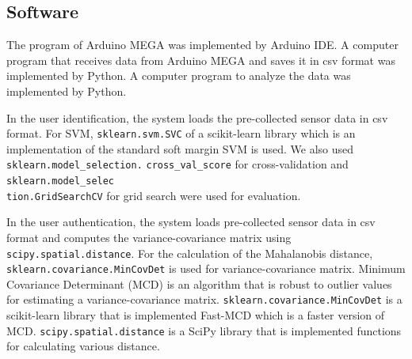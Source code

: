 \documentclass[sigchi,authordraft]{acmart}
\begin{document}
\subsection{Software}
The program of Arduino MEGA was implemented by Arduino IDE. A computer program that receives data from Arduino MEGA and saves it in csv format was implemented by Python. A computer program to analyze the data was implemented by Python.\par


In the user identification, the system loads the pre-collected sensor data in csv format. For SVM, \texttt{sklearn.svm.SVC} of a scikit-learn\cite{scikit-learn} library which is an implementation of the standard soft margin SVM is used. We also used \texttt{sklearn.model\_selection.} \texttt{cross\_val\_score} for cross-validation and \texttt{sklearn.model\_selec}\\\texttt{tion.GridSearchCV} for grid search were used for evaluation.\par


In the user authentication, the system loads pre-collected sensor data in csv format and computes the variance-covariance matrix using \texttt{scipy.spatial.distance}. For the calculation of the Mahalanobis distance, \texttt{sklearn.covariance.MinCovDet} is used for variance-covariance matrix. Minimum Covariance Determinant (MCD) is an algorithm that is robust to outlier values for estimating a variance-covariance matrix. \texttt{sklearn.covariance.MinCovDet} is a scikit-learn library that is implemented Fast-MCD\cite{fast_mcd} which is a faster version of MCD. \texttt{scipy.spatial.distance} is a SciPy\cite{scipy} library that is implemented functions for calculating various distance.

\end{document}

